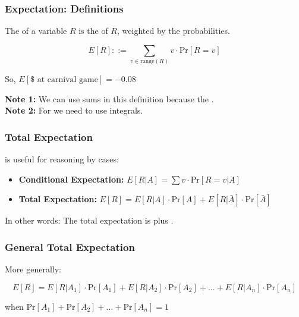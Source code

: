 \documentclass{beamer}
\begin{document}
\begin{frame}
  \frametitle{Expectation: Definitions}

  The  of a variable $R$ is the
   of $R$, weighted by the probabilities.

  \bigskip

  \begin{equation}
    E[R] ::= \sum_{v \in \text{range}(R)}v\cdot\text{Pr}[R = v]
  \end{equation}

  \bigskip
  So, $E[\$ \text{ at carnival game}] = -0.08$

  \vfill

  {\bf Note 1:} We can use sums in this definition because the
  .\\
  {\bf Note 2:} For  we need
  to use integrals.
\end{frame}

\begin{frame}
  \frametitle{Total Expectation}

   is useful for reasoning by cases:
  \bigskip

  \begin{itemize}
  \item {\bf Conditional Expectation:} $E[R|A] = \sum v\cdot\text{Pr}[R = v|A]$
    \bigskip

  \item {\bf Total Expectation:} $E[R] = E[R|A]\cdot\text{Pr}[A] +
    E[R|\bar{A}]\cdot\text{Pr}[\bar{A}]$
  \end{itemize}

  \bigskip

  In other words: The total expectation is  plus .
\end{frame}

\begin{frame}
  \frametitle{General Total Expectation}

  More generally:
  \bigskip

  \begin{equation}
    E[R] = E[R|A_1]\cdot\text{Pr}[A_1] + E[R|A_2]\cdot\text{Pr}[A_2] +
    \ldots + E[R|A_n]\cdot\text{Pr}[A_n]
  \end{equation}
  \bigskip

  when $\text{Pr}[A_1] + \text{Pr}[A_2] + \ldots + \text{Pr}[A_n] = 1$
\end{frame}
\end{document}
